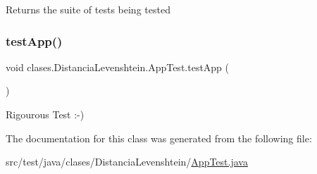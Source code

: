 \begin{DoxyReturn}{Returns}
the suite of tests being tested 
\end{DoxyReturn}
\hypertarget{classclases_1_1_distancia_levenshtein_1_1_app_test_afe16cffbe326f0e959c29805ac205c90}{}\label{classclases_1_1_distancia_levenshtein_1_1_app_test_afe16cffbe326f0e959c29805ac205c90} 
\subsubsection{\texorpdfstring{test\+App()}{testApp()}}
{\footnotesize\ttfamily void clases.\+Distancia\+Levenshtein.\+App\+Test.\+test\+App (\begin{DoxyParamCaption}{ }\end{DoxyParamCaption})}

Rigourous Test \+:-\/) 

The documentation for this class was generated from the following file\+:\begin{DoxyCompactItemize}
\item 
src/test/java/clases/\+Distancia\+Levenshtein/\hyperlink{_app_test_8java}{App\+Test.\+java}\end{DoxyCompactItemize}

